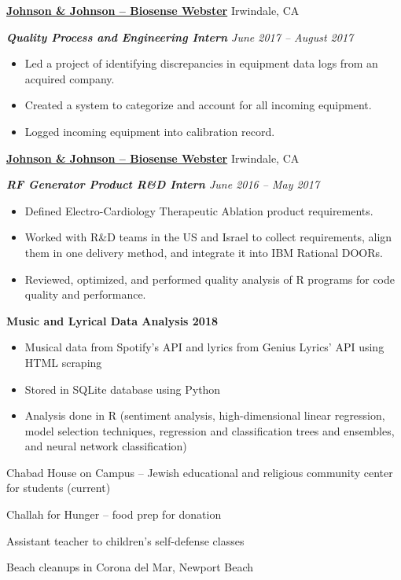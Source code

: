 \documentclass[9pt,letterpaper]{article}
\newcommand{\sectionHead}[1]{\vspace{.7ex} \noindent {\large \textbf{#1} \titlerule[.4pt]}}%
\begin{document}
\begin{description}[noitemsep]
\begin{itemize}[noitemsep]
		\end{itemize}
		\item \textbf{\ul{Johnson \& Johnson -- Biosense Webster}} \hfill Irwindale, CA
		\item \textit{\textbf{Quality Process and Engineering Intern} \hfill June 2017 -- August 2017}
		\begin{itemize}[noitemsep]
			\item Led a project of identifying discrepancies in equipment data logs from an acquired company.
			\item Created a system to categorize and account for all incoming equipment.
			\item Logged incoming equipment into calibration record.
		\end{itemize}
		\item \textbf{\ul{Johnson \& Johnson -- Biosense Webster}} \hfill Irwindale, CA
		\item \textit{\textbf{RF Generator Product R\&D Intern} \hfill June 2016 -- May 2017}
		\begin{itemize}[noitemsep]
			\item Defined Electro-Cardiology Therapeutic Ablation product requirements.
			\item Worked with R\&D teams in the US and Israel to collect requirements, align them in one delivery method, and integrate it into IBM Rational DOORs.
			\item Reviewed, optimized, and performed quality analysis of R programs for code quality and performance.
		\end{itemize}
	\end{description}
	
	\sectionHead{Projects}
	\begin{description}[noitemsep]
		\item \textbf{Music and Lyrical Data Analysis \hfill 2018}
		\begin{itemize}[noitemsep]
			\item Musical data from Spotify's API and lyrics from Genius Lyrics' API using HTML scraping
			\item Stored in SQLite database using Python
			\item Analysis done in R (sentiment analysis, high-dimensional linear regression, model selection techniques, regression and classification trees and ensembles, and neural network classification)
		\end{itemize}
	\end{description}
	
	\sectionHead{Volunteering}
	\begin{description}[topsep=3pt, noitemsep]
		\item Chabad House on Campus -- Jewish educational and religious community center for students (current)
		\item Challah for Hunger -- food prep for donation
		\item Assistant teacher to children’s self-defense classes
		\item Beach cleanups in Corona del Mar, Newport Beach
	\end{description}
	
\end{document}
